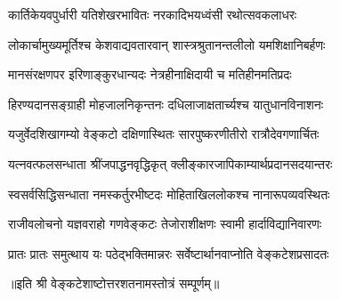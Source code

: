 \twolineshloka
{कार्तिकेयवपुर्धारी यतिशेखरभावितः}
{नरकादिभयध्वंसी रथोत्सवकलाधरः }
                                                        
\twolineshloka
{लोकार्चामुख्यमूर्तिश्च केशवाद्यवतारवान्}
{शास्त्रश्रुतानन्तलीलो यमशिक्षानिबर्हणः}
                                                            
\twolineshloka
{मानसंरक्षणपर इरिणाङ्कुरधान्यदः}
{नेत्रहीनाक्षिदायी च मतिहीनमतिप्रदः}
                                                                
\twolineshloka
{हिरण्यदानसङ्ग्राही मोहजालनिकृन्तनः}
{दधिलाजाक्षतार्च्यश्च यातुधानविनाशनः}
                                                                    
\twolineshloka
{यजुर्वेदशिखागम्यो वेङ्कटो दक्षिणास्थितः}
{सारपुष्करणीतीरो रात्रौदेवगणार्चितः}
                                                                        
\twolineshloka
{यत्नवत्फलसन्धाता श्रींजपाद्धनवृद्धिकृत्}
{क्लीङ्कारजापिकाम्यार्थप्रदानसदयान्तरः}
                                                                            
\twolineshloka
{स्वसर्वसिद्धिसन्धाता नमस्कर्तुरभीष्टदः}
{मोहिताखिललोकश्च नानारूपव्यवस्थितः}
                                                                                
\twolineshloka
{राजीवलोचनो यज्ञवराहो गणवेङ्कटः}
{तेजोराशीक्षणः स्वामी हार्दाविद्यानिवारणः}
                                                                                    
{प्रातः प्रातः  समुत्थाय  यः  पठेद्भक्तिमान्नरः}
{सर्वेष्टार्थानवाप्नोति  वेङ्कटेशप्रसादतः}

॥इति  श्री  वेङ्कटेशाष्टोत्तरशतनामस्तोत्रं  सम्पूर्णम्॥
